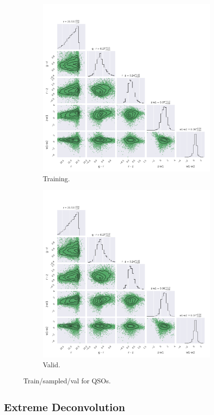 \begin{figure}
\centering
\begin{subfigure}[b]{.5\textwidth}
  \centering
  \includegraphics[width=\textwidth]{images/gmm/qso_training.png}
  \caption{Training.}
  \label{fig:qso_train}
\end{subfigure}%
\begin{subfigure}[b]{.5\textwidth}
  \centering
  \includegraphics[width=\textwidth]{images/gmm/qso_valid.png}
  \caption{Valid.}
  \label{fig:lrg_valid}
\end{subfigure}
\caption{Train/sampled/val for QSOs.}
\label{fig:qso_gmm}
\end{figure}



\subsection{Extreme Deconvolution}




